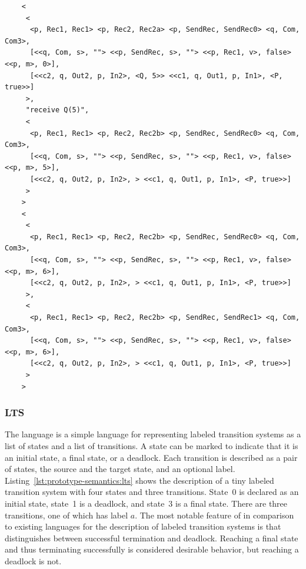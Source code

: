 \begin{listing}
  \lstset{
    language=cs,
    caption=Steps depicting the reception of a signal and the evaluation of an expression,
    label=lst:prototype-semantics:steps,
    numbers=none
  }
  \begin{lstlisting}
    <
     <
      <p, Rec1, Rec1> <p, Rec2, Rec2a> <p, SendRec, SendRec0> <q, Com, Com3>,
      [<<q, Com, s>, ""> <<p, SendRec, s>, ""> <<p, Rec1, v>, false> <<p, m>, 0>],
      [<<c2, q, Out2, p, In2>, <Q, 5>> <<c1, q, Out1, p, In1>, <P, true>>]
     >,
     "receive Q(5)",
     <
      <p, Rec1, Rec1> <p, Rec2, Rec2b> <p, SendRec, SendRec0> <q, Com, Com3>,
      [<<q, Com, s>, ""> <<p, SendRec, s>, ""> <<p, Rec1, v>, false> <<p, m>, 5>],
      [<<c2, q, Out2, p, In2>, > <<c1, q, Out1, p, In1>, <P, true>>]
     >
    >
    <
     <
      <p, Rec1, Rec1> <p, Rec2, Rec2b> <p, SendRec, SendRec0> <q, Com, Com3>,
      [<<q, Com, s>, ""> <<p, SendRec, s>, ""> <<p, Rec1, v>, false> <<p, m>, 6>],
      [<<c2, q, Out2, p, In2>, > <<c1, q, Out1, p, In1>, <P, true>>]
     >,
     <
      <p, Rec1, Rec1> <p, Rec2, Rec2b> <p, SendRec, SendRec1> <q, Com, Com3>,
      [<<q, Com, s>, ""> <<p, SendRec, s>, ""> <<p, Rec1, v>, false> <<p, m>, 6>],
      [<<c2, q, Out2, p, In2>, > <<c1, q, Out1, p, In1>, <P, true>>]
     >
    >
  \end{lstlisting}
\end{listing}

\subsubsection{LTS}
\label{subsubsec:prototyping-semantics:lts}
The language \LTS is a simple language for representing labeled transition systems as a list of states and a list of transitions.
A state can be marked to indicate that it is an initial state, a final state, or a deadlock.
Each transition is described as a pair of states, the source and the target state, and an optional label.
Listing~\ref{lst:prototype-semantics:lts} shows the \LTS description of a tiny labeled transition system  with four states and three transitions.
State~0 is declared as an initial state, state~1 is a deadlock, and state~3 is a final state.
There are three transitions, one of which has label $a$.
The most notable feature of \LTS in comparison to existing languages for the description of labeled transition systems is that \LTS distinguishes between successful termination and deadlock.
Reaching a final state and thus terminating successfully is considered desirable behavior, but reaching a deadlock is not.

